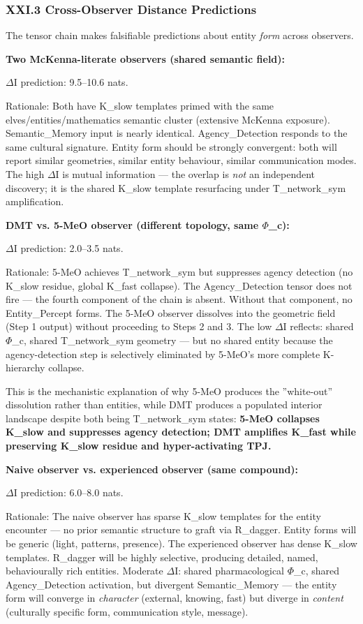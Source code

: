\documentclass[12pt,a4paper]{article}
\begin{document}
\subsubsection{XXI.3 Cross-Observer Distance Predictions}

The tensor chain makes falsifiable predictions about entity \emph{form} across observers.

\textbf{Two McKenna-literate observers (shared semantic field):}

$\Delta$I prediction: 9.5--10.6 nats.

Rationale: Both have K\_slow templates primed with the same elves/entities/mathematics semantic cluster (extensive McKenna exposure). Semantic\_Memory input is nearly identical. Agency\_Detection responds to the same cultural signature. Entity form should be strongly convergent: both will report similar geometries, similar entity behaviour, similar communication modes. The high $\Delta$I is mutual information --- the overlap is \emph{not} an independent discovery; it is the shared K\_slow template resurfacing under T\_network\_sym amplification.

\textbf{DMT vs. 5-MeO observer (different topology, same $\Phi$\_c):}

$\Delta$I prediction: 2.0--3.5 nats.

Rationale: 5-MeO achieves T\_network\_sym but suppresses agency detection (no K\_slow residue, global K\_fast collapse). The Agency\_Detection tensor does not fire --- the fourth component of the chain is absent. Without that component, no Entity\_Percept forms. The 5-MeO observer dissolves into the geometric field (Step 1 output) without proceeding to Steps 2 and 3. The low $\Delta$I reflects: shared $\Phi$\_c, shared T\_network\_sym geometry --- but no shared entity because the agency-detection step is selectively eliminated by 5-MeO's more complete K-hierarchy collapse.

This is the mechanistic explanation of why 5-MeO produces the ''white-out'' dissolution rather than entities, while DMT produces a populated interior landscape despite both being T\_network\_sym states: \textbf{5-MeO collapses K\_slow and suppresses agency detection; DMT amplifies K\_fast while preserving K\_slow residue and hyper-activating TPJ.}

\textbf{Naive observer vs. experienced observer (same compound):}

$\Delta$I prediction: 6.0--8.0 nats.

Rationale: The naive observer has sparse K\_slow templates for the entity encounter --- no prior semantic structure to graft via R\_dagger. Entity forms will be generic (light, patterns, presence). The experienced observer has dense K\_slow templates. R\_dagger will be highly selective, producing detailed, named, behaviourally rich entities. Moderate $\Delta$I: shared pharmacological $\Phi$\_c, shared Agency\_Detection activation, but divergent Semantic\_Memory --- the entity form will converge in \emph{character} (external, knowing, fast) but diverge in \emph{content} (culturally specific form, communication style, message).
\end{document}
